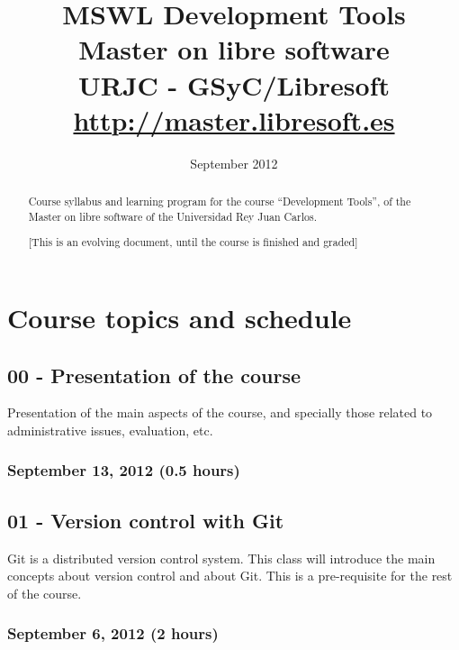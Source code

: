 \documentclass[a4paper]{article}
\title{MSWL Development Tools \\
Master on libre software \\
URJC - GSyC/Libresoft \\
\url{http://master.libresoft.es}}
\author{}
\date{September 2012}
\begin{document}
\maketitle

\begin{abstract}
Course syllabus and learning program for the course ``Development
Tools'', of the Master on libre software of the Universidad Rey Juan
Carlos.

[This is an evolving document, until the course is finished and graded]
\end{abstract}

\tableofcontents

\section{Course topics and schedule}

\subsection{00 - Presentation of the course}

Presentation of the main aspects of the course, and specially those
related to administrative issues, evaluation, etc.

\subsubsection{September 13, 2012 (0.5 hours)}

\subsection{01 - Version control with Git}

Git is a distributed version control system. This class will introduce
the main concepts about version control and about Git. This is a
pre-requisite for the rest of the course.

\subsubsection{September 6, 2012 (2 hours)}
\end{document}
